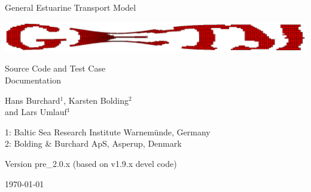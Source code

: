 \documentclass[a4paper,twoside]{article}
\begin{document}
\begin{titlepage}

\vfill

{\sf \bf \huge
 \begin{center}
   General Estuarine Transport Model
 \end{center}
}
\begin{center}
\includegraphics[width=\linewidth]{./figures/GETM2.ps}
\end{center}

\vspace{6mm}

{\sf \bf \LARGE
 \begin{center}
   Source Code and Test Case \\ Documentation
 \end{center}
}

{\sf \bf \LARGE
 \begin{center}
Hans Burchard$^{1}$, Karsten Bolding$^2$\\ and Lars Umlauf$^1$   
 \end{center}
}


\vspace{6mm}

{\sf \bf \Large
 \begin{center}
 1: Baltic Sea Research Institute Warnem\"unde, Germany \\
 2: Bolding \& Burchard ApS, Asperup, Denmark \\
 \end{center}
}


\vspace{5mm}

{\sf \bf \Large
 \begin{center}
  Version pre\_2.0.x (based on v1.9.x devel code)
 \end{center}
}

\vfill


{\sf \bf \Large
 \begin{center}
\today
 \end{center}
}

\vfill

\end{titlepage}


\cleardoublepage
\tableofcontents

\end{document}
